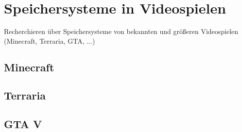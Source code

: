 \chapter{Speichersysteme in Videospielen}\label{ch:videospiele}

Recherchieren über Speichersysteme von bekannten und größeren Videospielen (Minecraft, Terraria, GTA, ...)

\section{Minecraft}
\section{Terraria}
\section{GTA V}